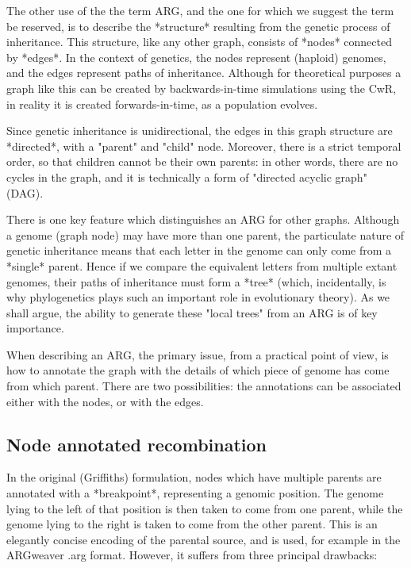 \documentclass{article}
\begin{document}
The other use of the the term ARG, and the one for which we suggest the term be reserved,
is to describe the *structure* resulting from the genetic process of inheritance. This structure,
like any other graph, consists of *nodes* connected by *edges*. In the context of genetics, the
nodes represent (haploid) genomes, and the edges represent paths of inheritance. Although for
theoretical purposes a graph like this can be created by backwards-in-time simulations using
the CwR, in reality it is created forwards-in-time, as a population evolves.

Since genetic inheritance is unidirectional, the edges in this graph structure are *directed*,
with a "parent" and "child" node. Moreover, there is a strict temporal order, so that children
cannot be their own parents: in other words, there are no cycles in the graph, and it is
technically a form of "directed acyclic graph" (DAG).


There is one key feature which distinguishes an ARG for other graphs. Although a genome
(graph node) may have more than one parent, the particulate nature of genetic inheritance
means that each letter in the genome can only come from a *single* parent. Hence if we
compare the equivalent letters from multiple extant genomes, their paths of inheritance must
form a *tree* (which, incidentally, is why phylogenetics plays such an important role in evolutionary
theory). As we shall argue, the ability to generate these "local trees" from an ARG is of key
importance.

When describing an ARG, the primary issue, from a practical point of view, is how to annotate
the graph with the details of which piece of genome has come from which parent. There
are two possibilities: the annotations can be associated either with the nodes, or with the edges.

\subsection*{Node annotated recombination}

In the original (Griffiths) formulation, nodes which have multiple parents are annotated with a
*breakpoint*, representing a genomic position. The genome lying to the left of that position is then taken to come from one parent, while the genome lying to the right is taken to come from the other parent. This is an elegantly concise encoding of the parental source, and is used, for example in the ARGweaver .arg format. However, it suffers from three principal drawbacks:
\end{document}
